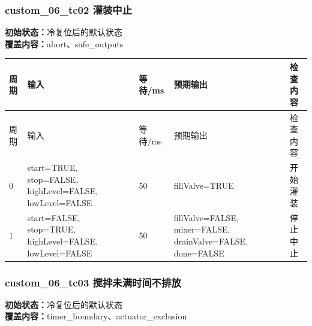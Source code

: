 \subsubsection{{\ttfamily custom\_06\_tc02} 灌装中止}

\noindent\textbf{初始状态：}冷复位后的默认状态\\

\textbf{覆盖内容：}abort、safe\_outputs

\begin{longtable}{L{1.0cm}L{4.7cm}L{1.4cm}L{4.0cm}L{2.1cm}}

\toprule

周期 & 输入 & 等待/ms & 预期输出 & 检查内容\\

\midrule

\endfirsthead

\toprule

周期 & 输入 & 等待/ms & 预期输出 & 检查内容\\

\midrule

\endhead

0 & start=TRUE, stop=FALSE, highLevel=FALSE, lowLevel=FALSE & 50 & fillValve=TRUE & 开始灌装\\

1 & start=FALSE, stop=TRUE, highLevel=FALSE, lowLevel=FALSE & 50 & fillValve=FALSE, mixer=FALSE, drainValve=FALSE, done=FALSE & 停止中止\\

\bottomrule

\end{longtable}

\subsubsection{{\ttfamily custom\_06\_tc03} 搅拌未满时间不排放}

\noindent\textbf{初始状态：}冷复位后的默认状态\\

\textbf{覆盖内容：}timer\_boundary、actuator\_exclusion

